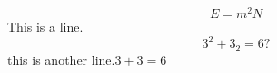 \documentclass{article}
\begin{document}
\begin{equation}
  E=m^2 \mathit{N}
\end{equation}
This is a line.\\
$$3^2 + 3_2 = 6 ?$$
this is another line.$3 + 3 = 6$
\end{document}
